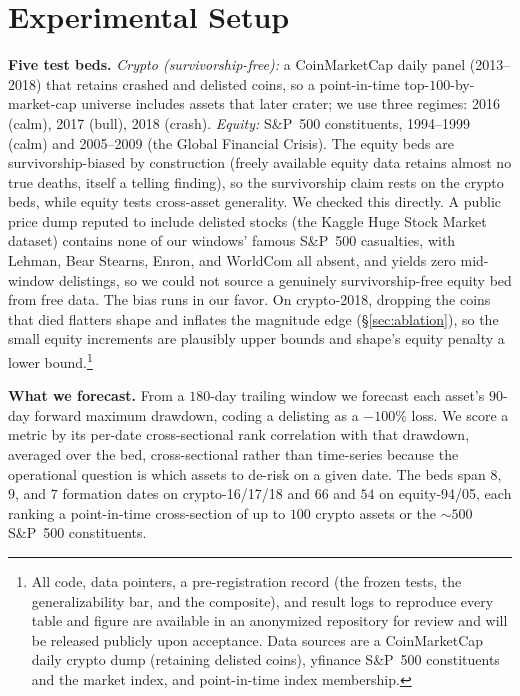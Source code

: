 \documentclass[sigconf,anonymous,nonacm]{acmart}
\begin{document}
\section{Experimental Setup}\label{sec:data}
\textbf{Five test beds.} \emph{Crypto (survivorship-free):} a CoinMarketCap daily
panel (2013--2018) that retains crashed and delisted coins, so a point-in-time
top-$100$-by-market-cap universe includes assets that later crater; we use three
regimes: 2016 (calm), 2017 (bull), 2018 (crash). \emph{Equity:} S\&P~500
constituents, 1994--1999 (calm) and 2005--2009 (the Global Financial Crisis). The equity beds are
survivorship-biased by construction (freely available equity data retains
almost no true deaths, itself a telling finding), so the survivorship claim
rests on the crypto beds, while equity tests cross-asset generality. We checked this
directly. A public price dump reputed to include delisted stocks (the Kaggle Huge Stock
Market dataset) contains none of our windows' famous S\&P~500 casualties, with Lehman,
Bear Stearns, Enron, and WorldCom all absent, and yields zero mid-window delistings, so we
could not source a genuinely survivorship-free equity bed from free data. The bias runs in
our favor. On crypto-2018, dropping the coins that died flatters shape and inflates the
magnitude edge (\S\ref{sec:ablation}), so the small equity increments are plausibly upper
bounds and shape's equity penalty a lower bound.\footnote{All code, data pointers,
a pre-registration record (the frozen tests, the generalizability bar, and the
composite), and result logs to reproduce every table and figure
are available in an anonymized repository for review and will be released publicly upon
acceptance. Data sources are a CoinMarketCap daily crypto dump (retaining delisted coins),
yfinance S\&P~500 constituents and the market index, and point-in-time index membership.}

\textbf{What we forecast.} From a $180$-day trailing window we forecast each asset's
$90$-day forward maximum drawdown, coding a delisting as a $-100\%$ loss. We score a
metric by its per-date cross-sectional rank correlation with that drawdown, averaged
over the bed, cross-sectional rather than time-series because the operational
question is which assets to de-risk on a given date. The beds span $8$, $9$, and $7$
formation dates on crypto-16/17/18 and $66$ and $54$ on equity-94/05, each ranking a
point-in-time cross-section of up to $100$ crypto assets or the ${\sim}500$ S\&P~500
constituents.
\end{document}
